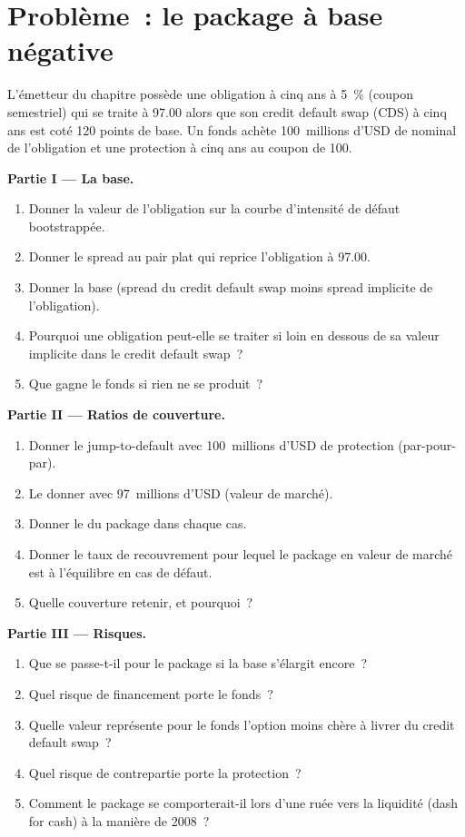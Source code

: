 \section{Problème~: le package à base négative}

\begin{problem}\label{pb:rc:reduced-form-credit:1}
L'émetteur du chapitre possède une obligation à cinq ans à 5~\% (coupon semestriel) qui se traite à 97.00 alors que son
credit default swap (CDS) à cinq ans est coté 120 points de base. Un fonds achète 100~millions d'USD
de nominal de l'obligation et une protection à cinq ans au coupon de 100.

\medskip\noindent\textbf{Partie I --- La base.}
\begin{enumerate}
\item Donner la valeur de l'obligation sur la courbe d'intensité de défaut bootstrappée.
\item Donner le spread au pair plat qui reprice l'obligation à 97.00.
\item Donner la base (spread du credit default swap moins spread implicite de l'obligation).
\item Pourquoi une obligation peut-elle se traiter si loin en dessous de sa valeur implicite dans le credit default swap~?
\item Que gagne le fonds si rien ne se produit~?
\end{enumerate}

\medskip\noindent\textbf{Partie II --- Ratios de couverture.}
\begin{enumerate}[resume]
\item Donner le jump-to-default avec 100~millions d'USD de protection (par-pour-par).
\item Le donner avec 97~millions d'USD (valeur de marché).
\item Donner le  du package dans chaque cas.
\item Donner le taux de recouvrement pour lequel le package en valeur de marché est à l'équilibre en cas de défaut.
\item Quelle couverture retenir, et pourquoi~?
\end{enumerate}

\medskip\noindent\textbf{Partie III --- Risques.}
\begin{enumerate}[resume]
\item Que se passe-t-il pour le package si la base s'élargit encore~?
\item Quel risque de financement porte le fonds~?
\item Quelle valeur représente pour le fonds l'option moins chère à livrer du credit default swap~?
\item Quel risque de contrepartie porte la protection~?
\item Comment le package se comporterait-il lors d'une ruée vers la liquidité (dash for cash) à la manière de 2008~?
\end{enumerate}


\end{problem}
